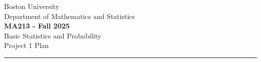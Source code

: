 \documentclass[12pt]{article}
\begin{document}
	
	
	
	\begin{center}		
        Boston University \\
        Department of Mathematics and Statistics \\ 
		\Large{\textbf{MA213 - Fall 2025}} \\ 
        \large{Basic Statistics and Probability} \\
        \large{Project 1 Plan} \\ 
		\noindent\rule{16cm}{2pt}
	\end{center}
	
\end{document}
